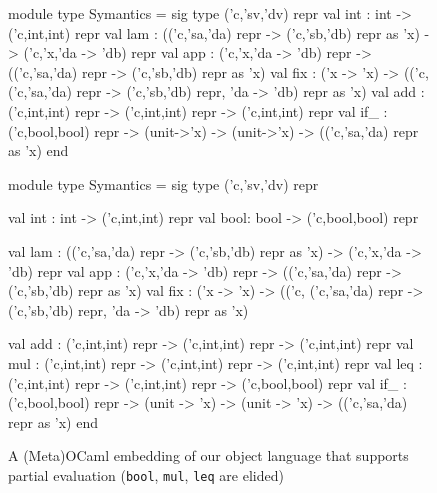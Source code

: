 \begin{figure}
\begin{floatrule}
\ifshort
\begin{code2}
module type Symantics = sig type ('c,'sv,'dv) repr
  val int : int -> ('c,int,int) repr
  val lam : (('c,'sa,'da) repr -> ('c,'sb,'db) repr as 'x)
            -> ('c,'x,'da -> 'db) repr
  val app : ('c,'x,'da -> 'db) repr
            -> (('c,'sa,'da) repr -> ('c,'sb,'db) repr as 'x)
  val fix : ('x -> 'x) -> (('c, ('c,'sa,'da) repr -> ('c,'sb,'db) repr,
                                'da -> 'db) repr as 'x)
  val add : ('c,int,int) repr -> ('c,int,int) repr -> ('c,int,int) repr
  val if_ : ('c,bool,bool) repr
            -> (unit->'x) -> (unit->'x) -> (('c,'sa,'da) repr as 'x) end
\end{code2}
\else
\begin{code2}
module type Symantics = sig
  type ('c,'sv,'dv) repr

  val int : int  -> ('c,int,int) repr
  val bool: bool -> ('c,bool,bool) repr

  val lam : (('c,'sa,'da) repr -> ('c,'sb,'db) repr as 'x)
            -> ('c,'x,'da -> 'db) repr
  val app : ('c,'x,'da -> 'db) repr
            -> (('c,'sa,'da) repr -> ('c,'sb,'db) repr as 'x)
  val fix : ('x -> 'x) -> (('c, ('c,'sa,'da) repr -> ('c,'sb,'db) repr,
                                'da -> 'db) repr as 'x)

  val add : ('c,int,int) repr -> ('c,int,int) repr -> ('c,int,int) repr
  val mul : ('c,int,int) repr -> ('c,int,int) repr -> ('c,int,int) repr
  val leq : ('c,int,int) repr -> ('c,int,int) repr -> ('c,bool,bool) repr
  val if_ : ('c,bool,bool) repr
            -> (unit -> 'x) -> (unit -> 'x) -> (('c,'sa,'da) repr as 'x)
end
\end{code2}
\fi
\end{floatrule}
\caption{A (Meta)OCaml embedding of our object language that supports
  partial evaluation \ifshort \protect\linebreak[2] (\texttt{bool},
  \texttt{mul}, \texttt{leq} are elided)\fi}
\label{fig:ocaml}
\end{figure}

